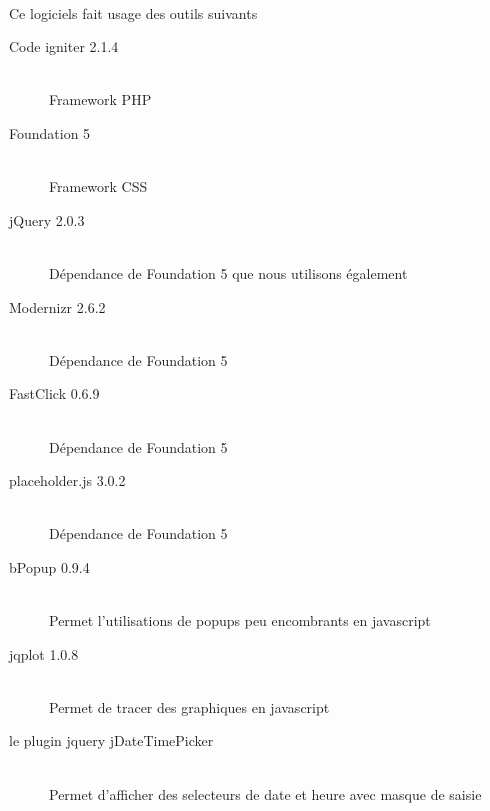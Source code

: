     \paragraph{}
        Ce logiciels fait usage des outils suivants
        \begin{description}
            \item[Code igniter 2.1.4]\hfill \\
                Framework PHP
            \item[Foundation 5]\hfill \\
                Framework CSS
            \item[jQuery 2.0.3]\hfill \\
                Dépendance de Foundation 5 que nous utilisons également
            \item[Modernizr 2.6.2]\hfill \\
                Dépendance de Foundation 5
            \item[FastClick 0.6.9]\hfill \\
                Dépendance de Foundation 5
            \item[placeholder.js 3.0.2]\hfill \\
                Dépendance de Foundation 5
            \item[bPopup 0.9.4]\hfill \\
                Permet l'utilisations de popups peu encombrants en javascript
            \item[jqplot 1.0.8]\hfill \\
                Permet de tracer des graphiques en javascript
            \item[le plugin jquery jDateTimePicker]\hfill \\
                Permet d'afficher des selecteurs de date et heure avec masque de saisie
        \end{description}